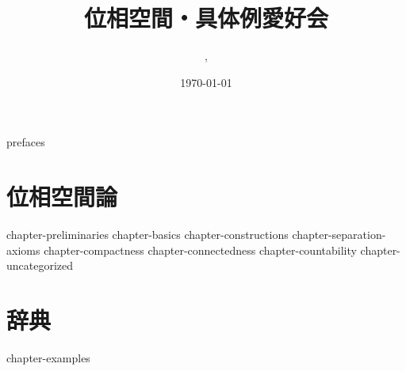 \documentclass[uplatex, dvipdfmx, a4paper, 12pt]{jsbook}
\begin{document}
\title{位相空間・具体例愛好会}
\author{\ykyki, \chen}
\date{\today}
\maketitle

\makeatletter
\makeatother

{prefaces}
\tableofcontents

\part{位相空間論}
\label{part:theories}

\setcounter{chapter}{-1}
{chapter-preliminaries}
{chapter-basics}
{chapter-constructions}
{chapter-separation-axioms}
{chapter-compactness}
{chapter-connectedness}
{chapter-countability}
{chapter-uncategorized}

\part{辞典}
\label{part:dictionary}
{chapter-examples}

\printindex

\printbibliography[title=参考文献]
\end{document}
